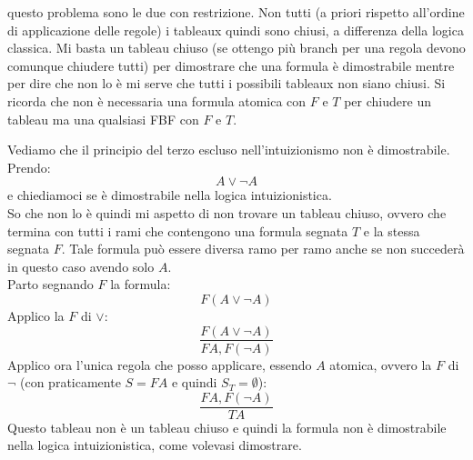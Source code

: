 \documentclass[a4paper,12pt, oneside]{book}
\begin{document}
questo problema sono le due con restrizione. Non tutti (a priori rispetto
all'ordine di applicazione delle regole) i tableaux quindi sono
chiusi, a differenza della logica classica. Mi basta un tableau chiuso (se
ottengo più branch per una regola devono comunque chiudere tutti) per
dimostrare che una formula è dimostrabile mentre per dire che non lo è mi serve
che tutti i possibili tableaux non siano chiusi. Si ricorda che non è necessaria
una formula atomica con $F$ e $T$ per chiudere un tableau ma una qualsiasi FBF
con $F$ e $T$.
\begin{esempio}
  Vediamo che il principio del terzo escluso nell'intuizionismo non è
  dimostrabile.\\
  Prendo:
  \[A\lor \neg A\]
  e chiediamoci se è dimostrabile nella logica intuizionistica.\\
  So che non lo è quindi mi aspetto di non trovare un tableau chiuso, ovvero
  che termina con tutti i rami che contengono una formula segnata $T$ e la stessa
  segnata $F$. Tale formula può essere diversa ramo per ramo anche se non
  succederà in questo caso avendo solo $A$.\\
  Parto segnando $F$ la formula:
  \[F(A\lor \neg A)\]
  Applico la $F$ di $\lor$:
  \[\frac{F(A\lor \neg A)}{FA,F(\neg A)}\]
  Applico ora l'unica regola che posso applicare, essendo $A$ atomica, ovvero
  la $F$ di $\neg$ (con praticamente $S=FA$ e quindi $S_T=\emptyset$):
  \[\frac{FA,F(\neg A)}{TA}\]
  Questo tableau non è un tableau chiuso e quindi la formula non è
  dimostrabile nella logica intuizionistica, come volevasi dimostrare.
\end{esempio}
\end{document}
